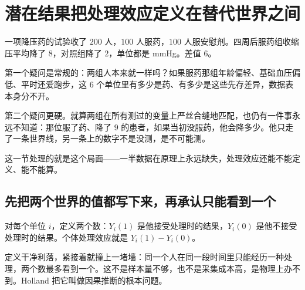 \section{潜在结果把处理效应定义在替代世界之间}
\label{sec:13-Machine-Learning/12-Causal-Inference/04}

一项降压药的试验收了 \(200\) 人，\(100\) 人服药，\(100\) 人服安慰剂。四周后服药组收缩压平均降了 \(8\)，对照组降了 \(2\)，单位都是 mmHg。差值 \(6\)。

第一个疑问是常规的：两组人本来就一样吗？如果服药那组年龄偏轻、基础血压偏低、平时还爱跑步，这 \(6\) 个单位里有多少是药、有多少是这些先存差异，数据表本身分不开。

第二个疑问更硬。就算两组在所有测过的变量上严丝合缝地匹配，也仍有一件事永远不知道：那位服了药、降了 \(9\) 的患者，如果当初没服药，他会降多少。他只走了一条世界线，另一条上的数字不是没测，是不可能测。

这一节处理的就是这个局面——一半数据在原理上永远缺失，处理效应还能不能定义、能不能算。

\subsection{先把两个世界的值都写下来，再承认只能看到一个}

对每个单位 \(i\)，定义两个数：\(Y_i(1)\) 是他接受处理时的结果，\(Y_i(0)\) 是他不接受处理时的结果。个体处理效应就是 \(Y_i(1)-Y_i(0)\)。

定义干净利落，紧接着就撞上一堵墙：同一个人在同一段时间里只能经历一种处理，两个数最多看到一个。这不是样本量不够，也不是采集成本高，是物理上办不到。Holland 把它叫做因果推断的根本问题。

